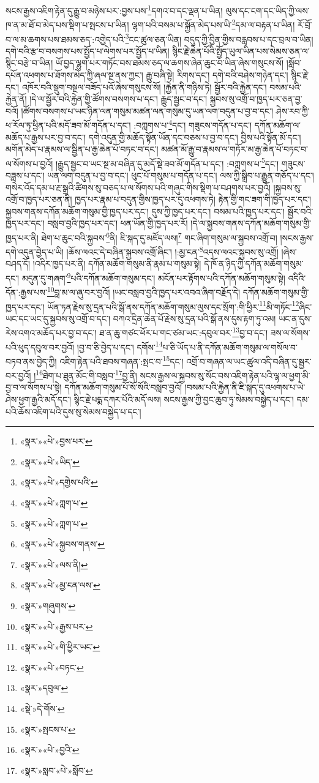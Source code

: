 སངས་རྒྱས་འཇིག་རྟེན་དུ་རྒྱུ་བ་མཉེས་པར་:བྱས་པས་\footnote{«སྣར་»«པེ་»བྱས་པར་}དགའ་བ་དང་ལྡན་པ་ཡིན། ལུས་དང་ངག་དང་ཡིད་ཀྱི་ལས་ཁ་ན་མ་ཐོ་བ་མེད་པས་སྡིག་པ་སྤངས་པ་ཡིན། ལྷག་པའི་བསམ་པ་སྐྱོན་མེད་པས་ཡི་\footnote{«སྣར་»«པེ་»ཡིད་}དམ་ལ་བརྟན་པ་ཡིན། རོ་བྲོ་བ་ལ་མ་ཆགས་པས་ཐམས་ཅད་:འགྱེད་པའི་\footnote{«སྣར་»«པེ་»དགྱེས་པའི་}ངང་ཚུལ་ཅན་ཡིན། བདུད་ཀྱི་བྱིན་གྱིས་བརླབས་པ་དང་བྲལ་བ་ཡིན། དགེ་བའི་རྩ་བ་བསགས་པས་སྤྱོད་པ་ལེགས་པར་སྤྱོད་པ་ཡིན། སྙིང་རྗེ་ཆེན་པོའི་སྤྱོད་ཡུལ་ཡིན་པས་སེམས་ཅན་ལ་སྙིང་བརྩེ་བ་ཡིན། ཡོ་བྱད་ལྷུག་པར་གཏོང་བས་ཐམས་ཅད་ལ་ཆགས་ཞེན་ཆུང་བ་ཡིན་ཞེས་གསུངས་སོ། །སློབ་དཔོན་འཕགས་པ་ཐོགས་མེད་ཀྱི་ཞལ་སྔ་ནས་ཀྱང་། རྒྱུ་བཞི་སྟེ། རིགས་དང་། དགེ་བའི་བཤེས་གཉེན་དང་། སྙིང་རྗེ་དང་། འཁོར་བའི་སྡུག་བསྔལ་བཟོད་པའོ་ཞེས་གསུངས་སོ། །རྐྱེན་ནི་གཉིས་ཏེ། སྦྱོར་བའི་རྐྱེན་དང་། བསམ་པའི་རྐྱེན་ནོ། །དེ་ལ་སྦྱོར་བའི་རྐྱེན་གྱི་ཚོགས་བསགས་པ་དང་། རྒྱུད་སྦྱང་བ་དང་། སྐྱབས་སུ་འགྲོ་བ་ཁྱད་པར་ཅན་བྱ་བའོ། །ཚོགས་བསགས་པ་ཡང་ཉིན་ལན་གསུམ་མཚན་ལན་གསུམ་དུ་ཡན་ལག་བདུན་པ་བྱ་བ་དང་། ཤེས་རབ་ཀྱི་ཕ་རོལ་ཏུ་ཕྱིན་པའི་མདོ་ཟབ་མོ་གདོན་པ་དང་། :བཀླགས་པ་\footnote{«སྣར་»«པེ་»ཀླག་པ་}དང་། གཟུངས་གདོན་པ་དང་། དཀོན་མཆོག་ལ་མཆོད་པ་རྒྱས་པར་བྱ་བ་དང་། དགེ་འདུན་གྱི་མཆོད་སྟོན་ཡོན་དང་བཅས་པ་བྱ་བ་དང་། བྱིས་པའི་སྟོན་མོ་དང་། མགོན་མེད་པ་རྣམས་ལ་སྦྱིན་པ་རྒྱ་ཆེན་པོ་བཏང་བ་དང་། མཚན་མོ་རྒྱུ་བ་རྣམས་ལ་གཏོར་མ་རྒྱ་ཆེན་པོ་བཏང་བ་ལ་སོགས་པ་བྱའོ། །རྒྱུད་སྦྱང་བ་ཡང་སྔ་མ་བཞིན་དུ་མདོ་སྡེ་ཟབ་མོ་གདོན་པ་དང་། :བཀླགས་པ་\footnote{«སྣར་»«པེ་»ཀླག་པ་}དང་། གཟུངས་བཟླས་པ་དང་། ཡན་ལག་བདུན་པ་བྱ་བ་དང་། ཕུང་པོ་གསུམ་པ་གདོན་པ་དང་། ལས་ཀྱི་སྒྲིབ་པ་རྒྱུན་གཅོད་པ་དང་། གསེར་འོད་དམ་པ་རྔ་སྒྲའི་ཚིགས་སུ་བཅད་པ་ལ་སོགས་པའི་གཞུང་གིས་སྡིག་པ་བཤགས་པར་བྱའོ། །སྐྱབས་སུ་འགྲོ་བ་ཁྱད་པར་ཅན་ནི། ཁྱད་པར་རྣམ་པ་བདུན་གྱིས་ཁྱད་པར་དུ་འཕགས་ཏེ། རྟེན་གྱི་གང་ཟག་གི་ཁྱད་པར་དང་། སྐྱབས་གནས་དཀོན་མཆོག་གསུམ་གྱི་ཁྱད་པར་དང་། དུས་ཀྱི་ཁྱད་པར་དང་། བསམ་པའི་ཁྱད་པར་དང་། སྦྱོར་བའི་ཁྱད་པར་དང་། བསླབ་བྱའི་ཁྱད་པར་དང་། ཕན་ཡོན་གྱི་ཁྱད་པར་རོ། །དེ་ལ་སྐྱབས་གནས་དཀོན་མཆོག་གསུམ་གྱི་ཁྱད་པར་ནི། ཐེག་པ་ཆུང་བའི་སྐྱབས་\footnote{«སྣར་»«པེ་»སྐྱབས་གནས་}ནི། ཇི་སྐད་དུ་མཛོད་ལས།\footnote{«སྣར་»«པེ་»ལས་ནི།} གང་ཞིག་གསུམ་ལ་སྐྱབས་འགྲོ་བ། །སངས་རྒྱས་དགེ་འདུན་བྱེད་པ་ཡི། །ཆོས་ལའང་དེ་བཞིན་སྐྱབས་འགྲོ་ཞིང་། །:མྱ་ངན་\footnote{«སྣར་»«པེ་»མྱ་ངན་ལས་}འདས་ལའང་སྐྱབས་སུ་འགྲོ། །ཞེས་བཤད་དོ། །འདིར་ཁྱད་པར་ནི། དཀོན་མཆོག་གསུམ་ནི་རྣམ་པ་གསུམ་སྟེ། དེ་ཁོ་ན་ཉིད་ཀྱི་དཀོན་མཆོག་གསུམ་དང་། མདུན་དུ་གཞག་\footnote{«སྣར་»གཞུགས་}པའི་དཀོན་མཆོག་གསུམ་དང་། མངོན་པར་རྟོགས་པའི་དཀོན་མཆོག་གསུམ་སྟེ། འདིའི་དོན་:རྒྱས་པས་\footnote{«སྣར་»«པེ་»རྒྱས་པར་}བླ་མ་ལ་ཞུ་བར་བྱའོ། །ཡང་བསླབ་བྱའི་ཁྱད་པར་འབའ་ཞིག་བརྗོད་དེ། དཀོན་མཆོག་གསུམ་གྱི་ཁྱད་པར་དང་། ཡོན་ཏན་རྗེས་སུ་དྲན་པའི་སྒོ་ནས་དཀོན་མཆོག་གསུམ་ལུས་དང་སྲོག་:གི་ཕྱིར་\footnote{«སྣར་»«པེ་»གི་ཕྱིར་ཡང་}མི་གཏོང་\footnote{«སྣར་»«པེ་»བཏང་}ཞིང་ཡང་དང་ཡང་དུ་སྐྱབས་སུ་འགྲོ་བ་དང་། བཀའ་དྲིན་ཆེན་པོ་རྗེས་སུ་དྲན་པའི་སྒོ་ནས་དུས་རྟག་ཏུ་འམ། ཡང་ན་དུས་རེས་འགའ་མཆོད་པར་བྱ་བ་དང་། ཐ་ན་ཆུ་གཙང་ཕོར་པ་གང་ཙམ་ཡང་:དབུལ་བར་\footnote{«སྣར་»དབུལ་}བྱ་བ་དང་། ཟས་ལ་སོགས་པའི་ཕུད་དབུལ་བར་བྱའོ། །བྱ་བ་ཅི་བྱེད་པ་དང་། དགོས་\footnote{«སྡེ་»དེ་གོས་}པ་ཅི་ཡོད་པ་ནི་དཀོན་མཆོག་གསུམ་ལ་གསོལ་བ་བཏབ་ནས་བྱེད་ཀྱི། འཇིག་རྟེན་པའི་ཐབས་གཞན་:སྤང་བ་\footnote{«སྣར་»སྤངས་པ་}དང་། འགྲོ་བ་གཞན་ལ་ཡང་ཚུལ་འདི་བཞིན་དུ་སྦྱར་བར་བྱའོ། །\footnote{«སྣར་»«པེ་»བྱའི་}ཐེག་པ་ཐུན་མོང་གི་བསླབ་\footnote{«སྣར་»སླབ་«པེ་»སློབ་}བྱ་ནི། སངས་རྒྱས་ལ་སྐྱབས་སུ་སོང་བས་འཇིག་རྟེན་པའི་ལྷ་ལ་ཕྱག་མི་བྱ་བ་ལ་སོགས་པ་སྟེ། དཀོན་མཆོག་གསུམ་པོ་སོ་སོའི་བསླབ་བྱའོ། །བསམ་པའི་རྐྱེན་ནི་ཇི་སྐད་དུ་འཕགས་པ་ཡེ་ཤེས་ཕྱག་རྒྱའི་མདོ་དང་། སྙིང་རྗེ་པདྨ་དཀར་པོའི་མདོ་ལས། སངས་རྒྱས་ཀྱི་བྱང་ཆུབ་ཏུ་སེམས་བསྐྱེད་པ་དང་། དམ་པའི་ཆོས་འཇིག་པའི་དུས་སུ་སེམས་བསྐྱེད་པ་དང་། 